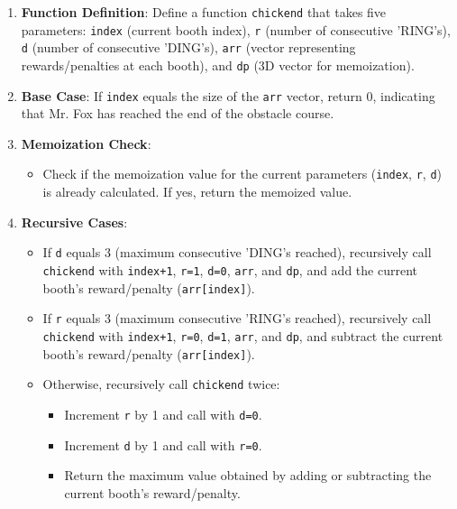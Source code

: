 \documentclass[8pt]{article}
\begin{document}
\begin{enumerate}
    \item \textbf{Function Definition}: Define a function \texttt{chickend} that takes five parameters: \texttt{index} (current booth index), \texttt{r} (number of consecutive 'RING's), \texttt{d} (number of consecutive 'DING's), \texttt{arr} (vector representing rewards/penalties at each booth), and \texttt{dp} (3D vector for memoization).
    
    \item \textbf{Base Case}: If \texttt{index} equals the size of the \texttt{arr} vector, return 0, indicating that Mr. Fox has reached the end of the obstacle course.
    
    \item \textbf{Memoization Check}:
    \begin{itemize}
        \item Check if the memoization value for the current parameters (\texttt{index}, \texttt{r}, \texttt{d}) is already calculated. If yes, return the memoized value.
    \end{itemize}
    
    \item \textbf{Recursive Cases}:
    \begin{itemize}
        \item If \texttt{d} equals 3 (maximum consecutive 'DING's reached), recursively call \texttt{chickend} with \texttt{index+1}, \texttt{r=1}, \texttt{d=0}, \texttt{arr}, and \texttt{dp}, and add the current booth's reward/penalty (\texttt{arr[index]}).
        \item If \texttt{r} equals 3 (maximum consecutive 'RING's reached), recursively call \texttt{chickend} with \texttt{index+1}, \texttt{r=0}, \texttt{d=1}, \texttt{arr}, and \texttt{dp}, and subtract the current booth's reward/penalty (\texttt{arr[index]}).
        \item Otherwise, recursively call \texttt{chickend} twice:
        \begin{itemize}
            \item Increment \texttt{r} by 1 and call with \texttt{d=0}.
            \item Increment \texttt{d} by 1 and call with \texttt{r=0}.
            \item Return the maximum value obtained by adding or subtracting the current booth's reward/penalty.
        \end{itemize}
    \end{itemize}
    
\end{enumerate}
\end{document}
